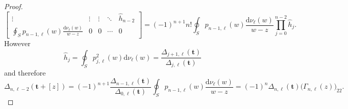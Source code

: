 \documentclass[10pt,reqno,oneside]{amsart}
\renewcommand{\d}{{\mathrm d}}
\numberwithin{equation}{section}
\newtheorem{theo}{Theorem}[section]
\def\bt{\begin{theo}}
\def\bt{{\mathbf t}}
\begin{document}
\begin{proof}
\begin{equation*}
\begin{bmatrix}
\vdots & \vdots &\vdots & \ddots&\widehat{h}_{n-2}\\
\oint_Sp_{n-1,\ell}(w)\frac{\d\nu_{\ell}(w)}{w-z} & 0 & 0 & \cdots & 0
\end{bmatrix}=
%
%
%
(-1)^{n+1}n!  \oint_S p_{n-1,\ell}(w)\frac{\d\nu_{\ell}(w) }{w-z}\prod_{j=0}^{n-2}\widehat{h}_j.
\end{equation*}
However
\begin{equation*}
	\widehat{h}_j = \oint_{S} p_{j,\ell}^2(w) \d \nu_{\ell}(w) = \frac {\Delta_{j+1,\ell}(\bt)}{\Delta_{j, \ell}(\bt)}
\end{equation*}
and therefore
\begin{equation*}
	\Delta_{n,\ell-2}(\bt +[z]) =(-1)^{n+1} \frac{\Delta_{n-1,\ell}(\bt)}{\Delta_{0,\ell}(\bt)}\oint_S p_{n-1,\ell}(w)\frac{\d\nu_{\ell}(w) }{w-z}=(-1)^n\Delta_{n,\ell}(\bt)\big(\Gamma_{n,\ell}(z)\big)_{22}.
\end{equation*}

\end{proof}
%
%
\end{document}
